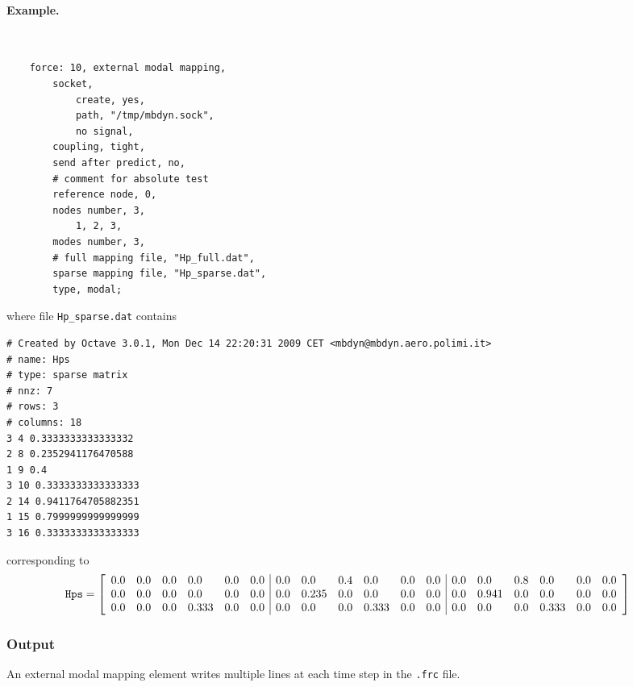 \paragraph{Example.} \
\begin{verbatim}
    force: 10, external modal mapping,
        socket,
            create, yes,
            path, "/tmp/mbdyn.sock",
            no signal,
        coupling, tight,
        send after predict, no,
        # comment for absolute test
        reference node, 0,
        nodes number, 3,
            1, 2, 3,
        modes number, 3,
        # full mapping file, "Hp_full.dat",
        sparse mapping file, "Hp_sparse.dat",
        type, modal;
\end{verbatim}
where file \texttt{Hp\_sparse.dat} contains
\begin{verbatim}
# Created by Octave 3.0.1, Mon Dec 14 22:20:31 2009 CET <mbdyn@mbdyn.aero.polimi.it>
# name: Hps
# type: sparse matrix
# nnz: 7
# rows: 3
# columns: 18
3 4 0.3333333333333332
2 8 0.2352941176470588
1 9 0.4
3 10 0.3333333333333333
2 14 0.9411764705882351
1 15 0.7999999999999999
3 16 0.3333333333333333
\end{verbatim}
corresponding to
{\small
\begin{align*}
	\texttt{Hps}
	&=
	\sqbr{\matr{llllll|llllll|llllll}{
		0.0 & 0.0 & 0.0 & 0.0   & 0.0 & 0.0 & 0.0 & 0.0   & 0.4 & 0.0   & 0.0 & 0.0 & 0.0 & 0.0   & 0.8 & 0.0   & 0.0 & 0.0
		\\
		0.0 & 0.0 & 0.0 & 0.0   & 0.0 & 0.0 & 0.0 & 0.235 & 0.0 & 0.0   & 0.0 & 0.0 & 0.0 & 0.941 & 0.0 & 0.0   & 0.0 & 0.0
		\\
		0.0 & 0.0 & 0.0 & 0.333 & 0.0 & 0.0 & 0.0 & 0.0   & 0.0 & 0.333 & 0.0 & 0.0 & 0.0 & 0.0   & 0.0 & 0.333 & 0.0 & 0.0
	}}
\end{align*}
}


\subsubsection{Output}
An external modal mapping element writes multiple lines at each time step
in the \texttt{.frc} file.

